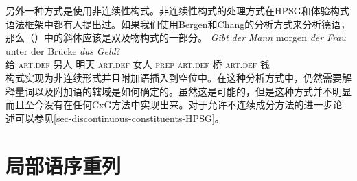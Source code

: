 另外一种方式是使用非连续性构式。非连续性构式的处理方式在HPSG\citep{Reape94a}和体验构式语法\citep{BC2005a}框架中都有人提出过。如果我们使用Bergen和Chang的分析方式来分析德语，那么（）中的斜体应该是双及物构式的一部分。
\ea
\gll \emph{Gibt} \emph{der} \emph{Mann} morgen \emph{der} \emph{Frau} unter der Brücke \emph{das} \emph{Geld}?\\
	 给 \textsc{art}.\textsc{def} 男人 明天 \textsc{art}.\textsc{def} 女人 \textsc{prep} \textsc{art}.\textsc{def} 桥 \textsc{art}.\textsc{def} 钱\\
\z
构式实现为非连续形式并且附加语插入到空位中。在这种分析方式中，仍然需要解释量词以及附加语的辖域是如何确定的。虽然这是可能的，但是这种方式并不明显而且至今没有在任何CxG方法中实现出来。对于允许不连续成分方法的进一步论述可以参见\ref{sec-discontinuous-constituents-HPSG}。

\section{局部语序重列}

